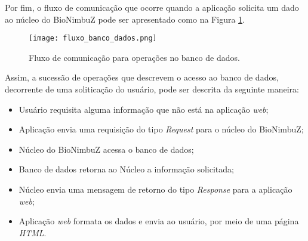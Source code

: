 Por fim, o fluxo de comunicação que ocorre quando a aplicação solicita um dado ao núcleo do BioNimbuZ pode ser apresentado como na Figura \ref{fig:fluxo_banco_dados}.

\begin{figure}[H]
	\centering
	\texttt{[image: fluxo\_banco\_dados.png]}
	\caption{Fluxo de comunicação para operações no banco de dados.}
	\label{fig:fluxo_banco_dados}
\end{figure}

Assim, a sucessão de operações que descrevem o acesso ao banco de dados, decorrente de uma soliticação do usuário, pode ser descrita da seguinte maneira:

\begin{itemize}
	\item [\textbf{1.}] Usuário requisita alguma informação que não está na aplicação \textit{web};
	\item [\textbf{2.}] Aplicação envia uma requisição do tipo \textit{Request} para o núcleo do BioNimbuZ;
	\item [\textbf{3.}] Núcleo do BioNimbuZ acessa o banco de dados;
	\item [\textbf{4.}] Banco de dados retorna ao Núcleo a informação solicitada;
	\item [\textbf{5.}] Núcleo envia uma mensagem de retorno do tipo \textit{Response} para a aplicação \textit{web};
	\item [\textbf{6.}] Aplicação \textit{web} formata os dados e envia ao usuário, por meio de uma página \textit{HTML}.
\end{itemize}